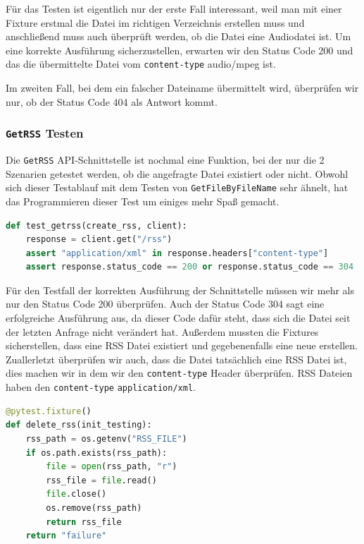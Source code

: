 \documentclass{article}
\begin{document}
Für das Testen ist eigentlich nur der erste Fall interessant, weil man mit einer Fixture erstmal die Datei im richtigen Verzeichnis erstellen muss und anschließend muss auch überprüft werden, ob die Datei eine Audiodatei ist. Um eine korrekte Ausführung sicherzustellen, erwarten wir den Status Code 200 und das die übermittelte Datei vom \texttt{content-type} audio/mpeg ist.

Im zweiten Fall, bei dem ein falscher Dateiname übermittelt wird, überprüfen wir nur, ob der Status Code 404 als Antwort kommt. 

\subsubsection{\texttt{GetRSS} Testen}

Die \texttt{GetRSS} API-Schnittstelle ist nochmal eine Funktion, bei der nur die 2 Szenarien getestet werden, ob die angefragte Datei existiert oder nicht. Obwohl sich dieser Testablauf mit dem Testen von \texttt{GetFileByFileName} sehr ähnelt, hat das Programmieren dieser Test um einiges mehr Spaß gemacht. 

\begin{lstlisting}[language=Python, caption=Test-Implementation von \texttt{/rss}]
def test_getrss(create_rss, client): 
    response = client.get("/rss") 
    assert "application/xml" in response.headers["content-type"] 
    assert response.status_code == 200 or response.status_code == 304 
\end{lstlisting}

Für den Testfall der korrekten Ausführung der Schnittstelle müssen wir mehr als nur den Status Code 200 überprüfen. Auch der Status Code 304 sagt eine erfolgreiche Ausführung aus, da dieser Code dafür steht, dass sich die Datei seit der letzten Anfrage nicht verändert hat. Außerdem mussten die Fixtures sicherstellen, dass eine RSS Datei existiert und gegebenenfalls eine neue erstellen. Zuallerletzt überprüfen wir auch, dass die Datei tatsächlich eine RSS Datei ist, dies machen wir in dem wir den \texttt{content-type} Header überprüfen. RSS Dateien haben den \texttt{content-type} \texttt{application/xml}. 

\begin{lstlisting}[language=Python, caption=Fixture zum löschen des RSS-Feeds]
@pytest.fixture() 
def delete_rss(init_testing): 
    rss_path = os.getenv("RSS_FILE") 
    if os.path.exists(rss_path): 
        file = open(rss_path, "r") 
        rss_file = file.read() 
        file.close() 
        os.remove(rss_path) 
        return rss_file 
    return "failure" 
\end{lstlisting}
\end{document}

